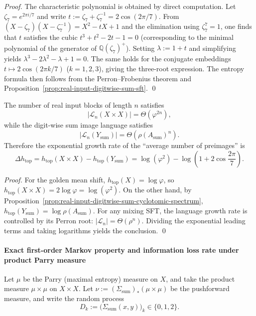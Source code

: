 \begin{proof}
The characteristic polynomial is obtained by direct computation.
Let $\zeta_7=e^{2\pi i/7}$ and write $t:=\zeta_7+\zeta_7^{-1}=2\cos(2\pi/7)$.
From $(X-\zeta_7)(X-\zeta_7^{-1})=X^2-tX+1$ and the elimination using $\zeta_7^7=1$, one finds that $t$ satisfies the cubic
\(
t^3+t^2-2t-1=0
\)
(corresponding to the minimal polynomial of the generator of $\mathbb{Q}(\zeta_7)^+$).
Setting $\lambda:=1+t$ and simplifying yields
\(
\lambda^3-2\lambda^2-\lambda+1=0
\).
The same holds for the conjugate embeddings $t\mapsto 2\cos(2\pi k/7)$ ($k=1,2,3$), giving the three-root expression.
The entropy formula then follows from the Perron--Frobenius theorem and Proposition~\ref{prop:real-input-digitwise-sum-sft}. \qed
\end{proof}

\begin{corollary}\label{cor:real-input-digitwise-sum-topological-degeneracy}
The number of real input blocks of length $n$ satisfies
\[
|\mathcal{L}_n(X\times X)|=\Theta(\varphi^{2n}),
\]
while the digit-wise sum image language satisfies
\[
|\mathcal{L}_n(Y_{\mathrm{sum}})|=\Theta(\rho(A_{\mathrm{sum}})^n).
\]
Therefore the exponential growth rate of the ``average number of preimages'' is
\[
\Delta h_{\mathrm{top}}
=h_{\mathrm{top}}(X\times X)-h_{\mathrm{top}}(Y_{\mathrm{sum}})
=\log(\varphi^2)-\log\!\left(1+2\cos\frac{2\pi}{7}\right).
\]
\end{corollary}

\begin{proof}
For the golden mean shift, $h_{\mathrm{top}}(X)=\log\varphi$, so $h_{\mathrm{top}}(X\times X)=2\log\varphi=\log(\varphi^2)$.
On the other hand, by Proposition~\ref{prop:real-input-digitwise-sum-cyclotomic-spectrum}, $h_{\mathrm{top}}(Y_{\mathrm{sum}})=\log\rho(A_{\mathrm{sum}})$.
For any mixing SFT, the language growth rate is controlled by its Perron root: $|\mathcal{L}_n|=\Theta(\rho^n)$.
Dividing the exponential leading terms and taking logarithms yields the conclusion. \qed
\end{proof}

\paragraph{Exact first-order Markov property and information loss rate under product Parry measure}
Let $\mu$ be the Parry (maximal entropy) measure on $X$, and take the product measure $\mu\times\mu$ on $X\times X$.
Let $\nu:=(\Sigma_{\mathrm{sum}})_\ast(\mu\times\mu)$ be the pushforward measure, and write the random process
\[
D_k:=\bigl(\Sigma_{\mathrm{sum}}(x,y)\bigr)_k\in\{0,1,2\}.
\]

